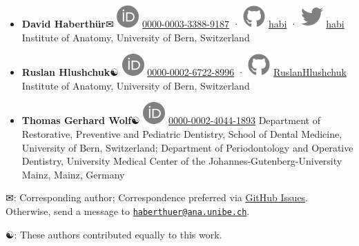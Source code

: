 \documentclass[
  american,
]{article}
\begin{document}
\begin{itemize}
\item
  \textbf{David Haberthür}✉
  \includegraphics{images/orcid.svg}
  \href{https://orcid.org/0000-0003-3388-9187}{0000-0003-3388-9187}
  · \includegraphics{images/github.svg}
  \href{https://github.com/habi}{habi}
  · \includegraphics{images/twitter.svg}
  \href{https://twitter.com/habi}{habi}
  Institute of Anatomy, University of Bern, Switzerland
\item
  \textbf{Ruslan Hlushchuk}☯
  \includegraphics{images/orcid.svg}
  \href{https://orcid.org/0000-0002-6722-8996}{0000-0002-6722-8996}
  · \includegraphics{images/github.svg}
  \href{https://github.com/RuslanHlushchuk}{RuslanHlushchuk}
  Institute of Anatomy, University of Bern, Switzerland
\item
  \textbf{Thomas Gerhard Wolf}☯
  \includegraphics{images/orcid.svg}
  \href{https://orcid.org/0000-0002-4044-1893}{0000-0002-4044-1893}
  Department of Restorative, Preventive and Pediatric Dentistry, School of Dental Medicine, University of Bern, Switzerland; Department of Periodontology and Operative Dentistry, University Medical Center of the Johannes-Gutenberg-University Mainz, Mainz, Germany
\end{itemize}

✉: Corresponding author; Correspondence preferred via \href{https://github.com/habi/zmk-tooth-cohort-method-manuscript/issues}{GitHub Issues}. Otherwise, send a message to \href{mailto:haberthuer@ana.unibe.ch}{\nolinkurl{haberthuer@ana.unibe.ch}}.

☯: These authors contributed equally to this work.
\end{document}
